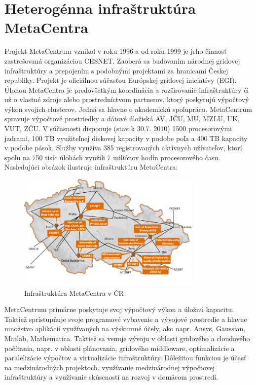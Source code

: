 \documentclass[printed,11pt,twoside,color,cover,table]{fithesis3}
\begin{document}
\chapter{Heterogénna infraštruktúra MetaCentra}
Projekt MetaCentrum vznikol v roku 1996 a od roku 1999 je jeho činnosť zastrešovaná organizáciou CESNET. Zaoberá sa budovaním národnej gridovej infraštruktúry a prepojením s podobnými projektami za hranicami
Českej republiky. Projekt je oficiálnou súčasťou Európskej gridovej iniciatívy (EGI). Úlohou MetaCentra je predovšetkým koordinácia a rozširovanie infraštruktúry či už o vlastné zdroje alebo prostredníctvom
partnerov, ktorý poskytujú výpočtový výkon svojich clusterov. Jedná sa hlavne o akademickú spoluprácu. MetaCentrum spravuje výpočtové prostriedky a dátové úložiská AV, JČU, MU, MZLU, UK, VUT, ZČU.
V súčasnosti disponuje (stav k 30.7. 2010) 1500 procesorovými jadrami, 100 TB využiteľnej diskovej kapacity v podobe poľa a 400 TB kapacity v podobe pások. Služby využíva 385 registrovaných aktívnych užívateľov, ktorí 
spolu na 750 tisíc úlohách využili 7 miliónov hodín procesorového času. Nasledujúci obrázok ilustruje infraštruktúru MetaCentra:
\begin{figure}[h]
\begin{center}
       \includegraphics[width=0.8\textwidth]{images/metacentrum.png}
       \caption{Infraštruktúra MetaCentra v ČR}
\end{center}
\end{figure}
MetaCentrum primárne poskytuje svoj výpočtový výkon a úložnú kapacitu. Taktiež sprístupňuje svoje programové vybavenie a vývojové prostredie a hlavne množstvo aplikácií využívaných na výskumné účely, ako napr. 
Ansys, Gaussian, Matlab, Mathematica. Taktiež sa venuje vývoju v oblasti gridového a cloudového počítania, napr. v oblasti plánovania, gridového middleware, optimalizácie a paralelizácie výpočtov a virtualizácie
infraštruktúry. Dôležitou funkciou je účasť na medzinárodných projektoch, využívanie medzinárodnej výpočtovej infraštruktúry a využívanie skúseností na rozvoj v domácom prostredí.\cite{metacentrum}
\end{document}
